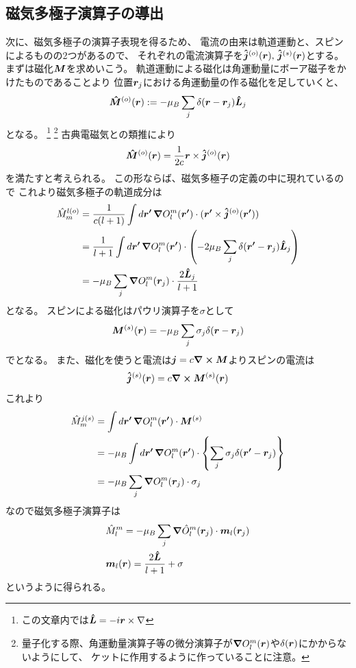 \documentclass[../master.tex]{subfiles}
\begin{document}
\subsection*{磁気多極子演算子の導出}
次に、磁気多極子の演算子表現を得るため、
電流の由来は軌道運動と、スピンによるものの2つがあるので、
それぞれの電流演算子を\(\vb*{\hat{j}}^{(o)}(\vb*{r}),\,\vb*{\hat{j}}^{(s)}(\vb*{r})\)とする。
まずは磁化\(\vb*{M}\)を求めいこう。
軌道運動による磁化は角運動量にボーア磁子をかけたものであることより
位置\(\vb*{r}_j\)における角運動量の作る磁化を足していくと、
\begin{equation}
    \vb*{\hat{M}}^{(o)}(\vb*{r}) := -\mu_B \sum_{j} \delta(\vb*{r}-\vb*{r}_j) \vb*{\hat{L}}_j
\end{equation}
となる。
\footnote{この文章内では\(\vb*{\hat{L}}=-i\vb*{r}\times \nabla\)}
\footnote{量子化する際、角運動量演算子等の微分演算子が\(\grad O_l^m(\vb*{r})\)や\(\delta(\vb*{r})\)にかからないようにして、
ケットに作用するように作っていることに注意。}
古典電磁気との類推により
\begin{equation}
    \vb*{\hat{M}}^{(o)}(\vb*{r}) = \frac{1}{2c}\vb*{r}\times \vb*{\hat{j}}^{(o)}(\vb*{r})
\end{equation}
を満たすと考えられる。
この形ならば、磁気多極子の定義の中に現れているので
これより磁気多極子の軌道成分は
\begin{align}
    \hat{M}_m^{l(o)}
    &= \frac{1}{c(l+1)} \int d\vb*{r'}\, \grad O_l^m(\vb*{r'})\cdot(\vb*{r'}\times \vb*{\hat{j}}^{(o)}(\vb*{r'}))\\
    &= \frac{1}{l+1} \int d\vb*{r'}\, \grad O_l^m(\vb*{r'})\cdot \qty(-2\mu_B \sum_j \delta(\vb*{r'}-\vb*{r}_j)\vb*{\hat{L}}_j)\\
    &= -\mu_B  \sum_j \grad O_l^m(\vb*{r}_j) \cdot \frac{2\vb*{\hat{L}}_j}{l+1}
\end{align}
となる。
スピンによる磁化はパウリ演算子を\(\sigma\)として
\begin{equation}
    \vb*{M}^{(s)}(\vb*{r}) = -\mu_B \sum_j \sigma_j \delta(\vb*{r}-\vb*{r}_j)
\end{equation}
でとなる。
また、磁化を使うと電流は\(\vb*{j}=c\curl\vb*{M}\)よりスピンの電流は
\begin{equation}
    \vb*{\hat{j}}^{(s)}(\vb*{r}) = c \curl \vb*{M}^{(s)}(\vb*{r})
\end{equation}
これより
\begin{align}
    \hat{M}_m^{j(s)}
    &= \int d\vb*{r'}\,\grad O_l^m(\vb*{r'}) \cdot \vb*{M}^{(s)} \\
    &= -\mu_B  \int d\vb*{r'}\,\grad O_l^m(\vb*{r'})\cdot\qty{\sum_j \sigma_j \delta(\vb*{r'}-\vb*{r}_j)} \\
    &= -\mu_B  \sum_{j}  \grad O_l^m(\vb*{r}_j)\cdot \sigma_j
\end{align}
なので磁気多極子演算子は
\begin{align}
    &\hat{M}_l^m = -\mu_B  \sum_j \grad \hat{O}_l^m(\vb*{r}_j) \cdot \vb*{m}_l(\vb*{r}_j)\\
    &\vb*{m}_l(\vb*{r}) = \frac{2\vb*{\hat{L}}}{l+1}+\sigma
\end{align}
というように得られる。
\end{document}
